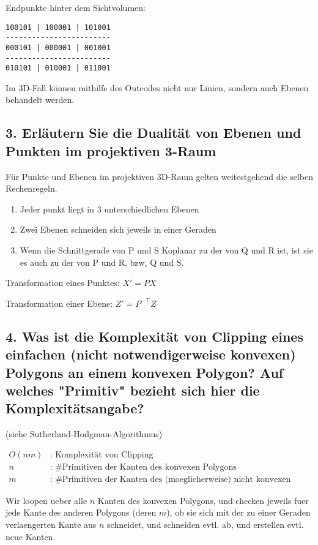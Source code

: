 \documentclass[a4paper,headings=small]{scrartcl}
\numberwithin{equation}{section} %
\numberwithin{figure}{section}   %
\begin{document}
Endpunkte hinter dem Sichtvolumen:
\begin{verbatim}
100101 | 100001 | 101001
------------------------
000101 | 000001 | 001001
------------------------
010101 | 010001 | 011001
\end{verbatim}

Im 3D-Fall können mithilfe des Outcodes nicht nur Linien, sondern auch Ebenen behandelt werden.

\subsection{3. Erläutern Sie die Dualität von Ebenen und Punkten im projektiven 3-Raum}
Für Punkte und Ebenen im projektiven 3D-Raum gelten weitestgehend die selben Rechenregeln.

\begin{enumerate}
\item Jeder punkt liegt in 3 unterschiedlichen Ebenen \\
\item Zwei Ebenen schneiden sich jeweils in einer Geraden \\
\item Wenn die Schnittgerade von P und S Koplanar zu der von Q und R ist,
  ist sie es auch zu der von P und R, bzw, Q und S.
\end{enumerate}

Transformation eines Punktes: $X' = P X$

Transformation einer Ebene: $Z' = P^{-\top} Z$

\subsection{4. Was ist die Komplexität von Clipping eines einfachen (nicht notwendigerweise konvexen) Polygons an einem konvexen Polygon? Auf welches "Primitiv" bezieht sich hier die Komplexitätsangabe?}

(siehe Sutherland-Hodgman-Algorithmus)

\begin{align*}
O(n m)& \text{: Komplexität von Clipping} \\
n& \text{: \# Primitiven der Kanten des konvexen Polygons} \\
m& \text{: \# Primitiven der Kanten des (moeglicherweise) nicht konvexen Polygons}
\end{align*}

Wir loopen ueber alle $n$ Kanten des konvexen Polygons,
und checken jeweils fuer jede Kante des anderen Polygons (deren $m$),
ob sie sich mit der zu einer Geraden verlaengerten Kante aus $n$ schneidet,
und schneiden evtl. ab, und erstellen evtl. neue Kanten.
\end{document}
